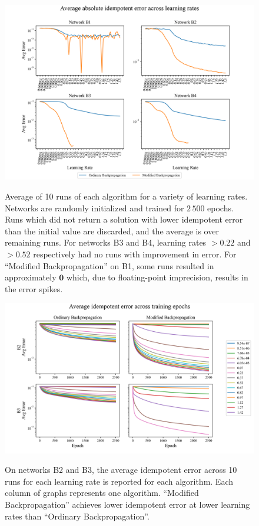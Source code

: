 \documentclass{article}
\begin{document}
\begin{figure}[H]
  \centering
  \includegraphics[width=\textwidth]{./resources/abs_err_b1234.png}
  \label{fig:avg-abs-err}
  \caption{Average of 10 runs of each algorithm for a variety of learning rates. Networks are randomly initialized and trained for $2\,500$ epochs. Runs which did not return a solution with lower idempotent error than the initial value are discarded, and the average is over remaining runs. For networks B3 and B4, learning rates $>0.22$ and $>0.52$ respectively had no runs with improvement in error. For ``Modified Backpropagation'' on B1, some runs resulted in approximately $\bm{0}$ which, due to floating-point imprecision, results in the error spikes.}
\end{figure}

\begin{figure}[H]
  \centering
  \includegraphics[width=\textwidth]{./resources/runs_err_b23.png}
  \label{fig:avg-epoch-err}
  \caption{On networks B2 and B3, the average idempotent error across 10 runs for each learning rate is reported for each algorithm. Each column of graphs represents one algorithm. ``Modified Backpropagation'' achieves lower idempotent error at lower learning rates than ``Ordinary Backpropagation''.}
\end{figure}
\end{document}
